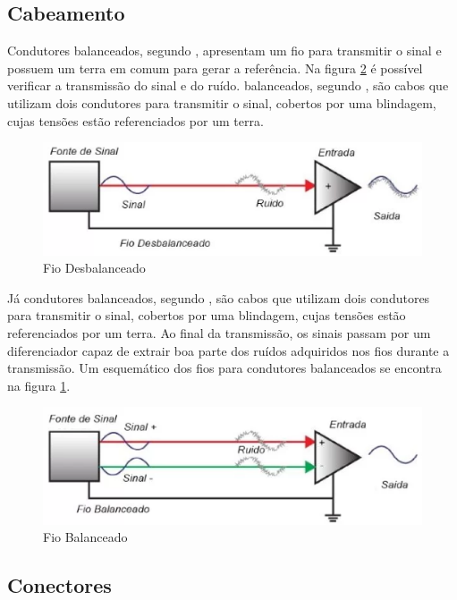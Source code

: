 \subsection{Cabeamento}
Condutores balanceados, segundo \cite{bartlett}, apresentam um fio para transmitir o sinal e possuem um terra em comum para gerar a referência. Na figura \ref{fig11} é possível verificar a transmissão do sinal e do ruído.
balanceados, segundo \cite{bartlett}, são cabos que utilizam dois condutores para transmitir o sinal, cobertos por uma blindagem, cujas tensões estão referenciados por um terra. 

\begin{figure}[h]
	\centering
    \includegraphics[scale=0.4]{figuras/fig11.eps}
	\caption{Fio Desbalanceado}
	\label{fig12}
\end{figure}

Já condutores balanceados, segundo \cite{bartlett}, são cabos que utilizam dois condutores para transmitir o sinal, cobertos por uma blindagem, cujas tensões estão referenciados por um terra. Ao final da transmissão, os sinais passam por um diferenciador capaz de extrair boa parte dos ruídos adquiridos nos fios durante a transmissão. Um esquemático dos fios para condutores balanceados se encontra na figura \ref{fig12}.

\begin{figure}[h]
	\centering
    \includegraphics[scale=0.4]{figuras/fig12.eps}
	\caption{Fio Balanceado}
	\label{fig11}
\end{figure}

\subsection{Conectores}

